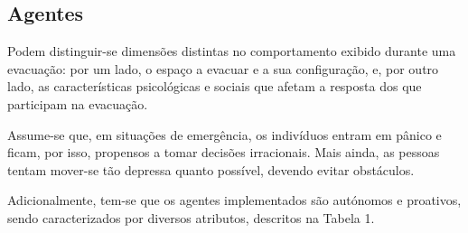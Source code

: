 \documentclass[12pt]{article}
\begin{document}
\begin{titlepage}
\subsection{Agentes}

Podem distinguir-se dimensões distintas no comportamento exibido durante uma evacuação: por um lado, o espaço a evacuar e a sua configuração, e, por outro lado, as características psicológicas e sociais que afetam a resposta dos que participam na evacuação.

Assume-se que, em situações de emergência, os indivíduos entram em pânico e ficam, por isso, propensos a tomar decisões irracionais. Mais ainda, as pessoas tentam mover-se tão depressa quanto possível, devendo evitar obstáculos.

Adicionalmente, tem-se que os agentes implementados são autónomos e proativos, sendo caracterizados por diversos atributos, descritos na Tabela 1.


\end{titlepage}
\end{document}
